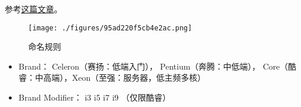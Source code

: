 
\begin{issues}
\issueDraft
\end{issues}

参考\href{https://www.itechtics.com/processor-generations/}{这篇文章}。

\begin{figure}[ht]
\centering
\texttt{[image: ./figures/95ad220f5cb4e2ac.png]}
\caption{命名规则} \label{fig_IntelC_1}
\end{figure}

\begin{itemize}
\item Brand： Celeron（赛扬：低端入门）， Pentium（奔腾：中低端）， Core（酷睿：中高端），Xeon（至强：服务器，低主频多核）
\item Brand Modifier： i3 i5 i7 i9 （仅限酷睿）
\end{itemize}
